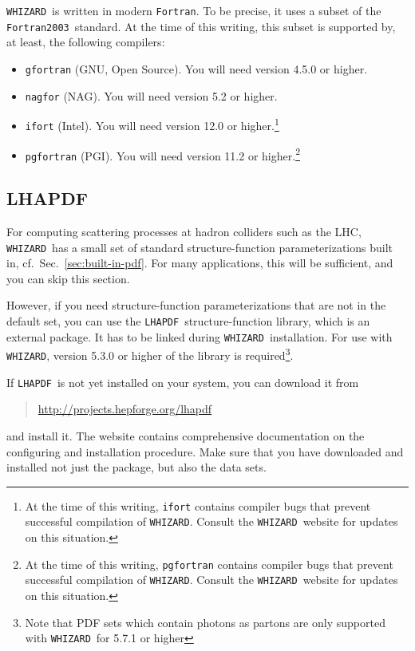 \documentclass[12pt]{book}
\newcommand{\ttt}[1]{\texttt{#1}}
\newcommand{\whizard}{\texttt{WHIZARD}}
\newcommand{\lhapdf}{\texttt{LHAPDF}}
\newcommand{\fortran}{\texttt{Fortran}}
\newcommand{\fortranOThree}{\texttt{Fortran2003}}
\begin{document}
\whizard\ is written in modern \fortran.  To be precise, it uses a
subset of the \fortranOThree\ standard.  At the time of this writing,
this subset is supported by, at least, the following compilers:
\begin{itemize}
\item
  \ttt{gfortran} (GNU, Open Source).  You will need version 4.5.0
  or higher.
\item
  \ttt{nagfor} (NAG).  You will need version 5.2 or higher.
\item
  \ttt{ifort} (Intel).  You will need version 12.0 or
  higher.\footnote{At the time of this writing, \ttt{ifort}
    contains compiler bugs that prevent successful compilation of
    \whizard.  Consult the \whizard\ website for updates on this
    situation.}
\item
  \ttt{pgfortran} (PGI).  You will need version 11.2 or
  higher.\footnote{At the time of this writing, \ttt{pgfortran}
    contains compiler bugs that prevent successful compilation of
    \whizard.  Consult the \whizard\ website for updates on this
    situation.}
\end{itemize}


\subsection{LHAPDF}
\label{sec:lhapdf}

For computing scattering processes at hadron colliders such as the
LHC, \whizard\ has a small set of standard structure-function
parameterizations built in, cf.\ Sec.~\ref{sec:built-in-pdf}.  For
many applications, this will be sufficient, and you can skip this
section.

However, if you need structure-function parameterizations that are not
in the default set, you can use the \lhapdf\ structure-function
library, which is an external package.  It has to be linked during
\whizard\ installation.  For use with \whizard, version 5.3.0 or
higher of the library is required\footnote{ Note that PDF sets which
  contain photons as partons are only supported with \whizard\ for
  5.7.1 or higher}.

If \lhapdf\ is not yet installed on your system, you can download it from
\begin{quote}
\url{http://projects.hepforge.org/lhapdf}
\end{quote}
and install it.  The website contains comprehensive documentation on
the configuring and installation procedure.  Make sure that you have
downloaded and installed not just the package, but also the data sets.
\end{document}
